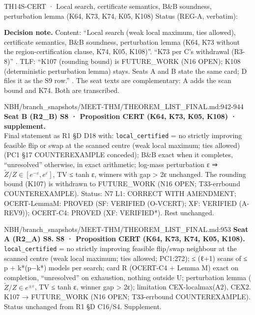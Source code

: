 \begin{card}{TH14}{S-CERT · Local search, certificate semantics, B\&B soundness, perturbation lemma (K64, K73, K74, K05, K108)}
\approvedFB\quad Status (REG-A, verbatim):  

\textbf{Decision note.} Content: ``Local search (weak local maximum, ties allowed), certificate semantics, B\&B soundness, perturbation lemma (K64, K73 without the region-certification clause, K74, K05, K108)''. ``K73 per C's withdrawal (R3-8)'' . TLF: ``K107 (rounding bound) is FUTURE\_WORK (N16 OPEN); K108 (deterministic perturbation lemma) stays. Seats A and B state the same card; D files it as the S9 row.'' . The seat texts are complementary: A adds the scan bound and K74. Both are transcribed.

\begin{stmt}{NBH/branch_snapshots/MEET-THM/THEOREM_LIST_FINAL.md:942-944}
\textbf{Seat B (R2\_B) S8 · Proposition CERT (K64, K73, K05, K108) · supplement.}\\
Final statement as R1 §D D18 with: \texttt{local\_certified} = no strictly improving feasible flip or swap at the scanned centre (weak local maximum; ties allowed) (PC1 §17 COUNTEREXAMPLE conceded); B\&B exact when it completes, ``unresolved'' otherwise, in exact arithmetic; log-mass perturbation ε ⇒ $\tilde{Z}/Z ∈ [e^{−ε}, e^{ε}]$, TV ≤ tanh ε, winners with gap > 2ε unchanged. The rounding bound (K107) is withdrawn to FUTURE\_WORK (N16 OPEN; T33-errbound COUNTEREXAMPLE). Status: N7 L1: CORRECT WITH AMENDMENT; OCERT-LemmaM: PROVED (SF: VERIFIED (O-VCERT); XF: VERIFIED (A-REV9)); OCERT-C4: PROVED (XF: VERIFIED*). Rest unchanged.
\end{stmt}

\begin{stmt}{NBH/branch_snapshots/MEET-THM/THEOREM_LIST_FINAL.md:953}
\textbf{Seat A (R2\_A) S8.} \textbf{S8 · Proposition CERT (K64, K73, K74, K05, K108).} \texttt{local\_certified} = no strictly improving feasible flip/swap neighbour at the scanned centre (weak local maximum; ties allowed; PC1:272); ≤ (ℓ+1) scans of ≤ p + k*(p−k*) models per search; card R (OCERT-C4 + Lemma M) exact on completion, ``unresolved'' on exhaustion, nothing outside U; perturbation lemma ($\tilde{Z}/Z ∈ e^{±ε}$, TV ≤ tanh ε, winner gap > 2ε); limitation CEX-localmax(A2), CEX2. K107 → FUTURE\_WORK (N16 OPEN; T33-errbound COUNTEREXAMPLE). Status unchanged from R1 §D C16/S4. Supplement.
\end{stmt}


\end{card}
